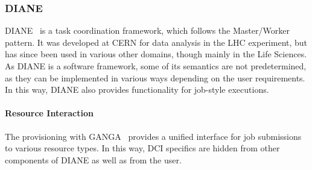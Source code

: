\documentclass{sig-alternate}
\begin{document}

%
%
\subsubsection{DIANE}
\label{sec:diane}

DIANE~\cite{Moscicki:908910} is a task coordination framework, which follows
the Master/Worker pattern. It was developed at CERN for data analysis in the
LHC experiment, but has since been used in various other domains, though mainly
in the Life Sciences. As DIANE is a software framework, some of its semantics
are not predetermined, as they can be implemented in various ways depending on
the user requirements. In this way, DIANE also provides \pilot functionality
for job-style executions.

\paragraph{Resource Interaction}
The \pilot provisioning with GANGA~\cite{Moscicki20092303} provides a unified
interface for job submissions to various resource types. In this way, DCI specifics are hidden
from other components of DIANE as well as from the user.
\end{document}
